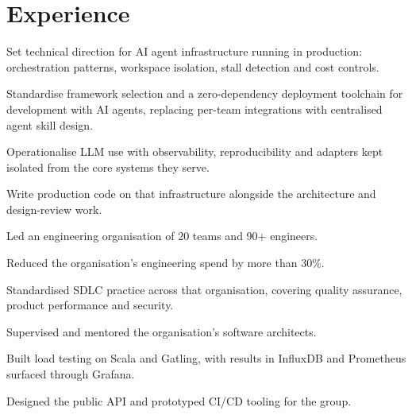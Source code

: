 
\section{Experience}

\begin{points}
  \item Set technical direction for AI agent infrastructure running in production:
        orchestration patterns, workspace isolation, stall detection and cost controls.
  \item Standardise framework selection and a zero-dependency deployment toolchain for
        development with AI agents, replacing per-team integrations with centralised
        agent skill design.
  \item Operationalise LLM use with observability, reproducibility and adapters kept
        isolated from the core systems they serve.
  \item Write production code on that infrastructure alongside the architecture and
        design-review work.
\end{points}

\begin{points}
  \item Led an engineering organisation of 20 teams and 90+ engineers.
  \item Reduced the organisation's engineering spend by more than 30\%.
  \item Standardised SDLC practice across that organisation, covering quality assurance,
        product performance and security.
  \item Supervised and mentored the organisation's software architects.
\end{points}

\begin{points}
  \item Built load testing on Scala and Gatling, with results in InfluxDB and Prometheus
        surfaced through Grafana.
  \item Designed the public API and prototyped CI/CD tooling for the group.
\end{points}

